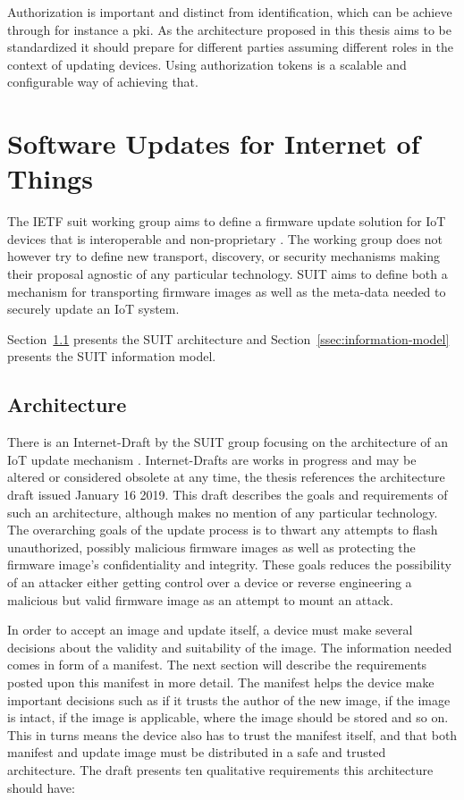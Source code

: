 \documentclass[0-thesis.tex]{subfiles}
\begin{document}
Authorization is important and distinct from identification, which can be achieve through
for instance a \gls{pki}. As the architecture proposed in this thesis aims to be
standardized it should prepare for different parties assuming different roles in the
context of updating devices. Using authorization tokens is a scalable and configurable way
of achieving that.

\section{Software Updates for Internet of Things}
\label{sec:suit}
The IETF \acrfull{suit} working group aims to define a firmware update solution for IoT
devices that is interoperable and non-proprietary \parencite{suit}. The working group does
not however try to define new transport, discovery, or security mechanisms making their
proposal agnostic of any particular technology. SUIT aims to define both a mechanism for
transporting firmware images as well as the meta-data needed to securely update an IoT
system.

Section~\ref{ssec:architecture} presents the SUIT architecture and
Section~\ref{ssec:information-model} presents the SUIT information model.

\subsection{Architecture}
\label{ssec:architecture}
There is an Internet-Draft by the SUIT group focusing on the architecture of an IoT update
mechanism \parencite{suit-architecture}. Internet-Drafts are works in progress and may be
altered or considered obsolete at any time, the thesis references the architecture draft
issued January 16 2019. This draft describes the goals and requirements of such an
architecture, although makes no mention of any particular technology. The overarching
goals of the update process is to thwart any attempts to flash unauthorized, possibly
malicious firmware images as well as protecting the firmware image's confidentiality and
integrity. These goals reduces the possibility of an attacker either getting control over
a device or reverse engineering a malicious but valid firmware image as an attempt to
mount an attack.

In order to accept an image and update itself, a device must make several decisions about
the validity and suitability of the image. The information needed comes in form of a
manifest. The next section will describe the requirements posted upon this manifest in
more detail. The manifest helps the device make important decisions such as if it trusts
the author of the new image, if the image is intact, if the image is applicable, where the
image should be stored and so on. This in turns means the device also has to trust the
manifest itself, and that both manifest and update image must be distributed in a safe and
trusted architecture. The draft \parencite{suit-architecture} presents ten qualitative
requirements this architecture should have:
\end{document}
